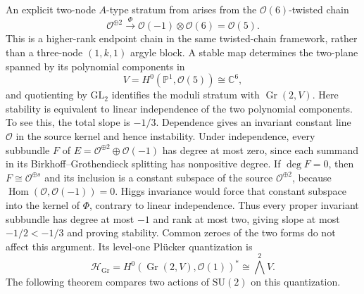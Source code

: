 \documentclass[11pt]{article}
\theoremstyle{definition}
\theoremstyle{remark}
\newcommand{\C}{\mathbb C}
\newcommand{\Pp}{\mathbb P}
\newcommand{\cH}{\mathcal H}
\newcommand{\cO}{\mathcal O}
\newcommand{\Hom}{\operatorname{Hom}}
\newcommand{\Gr}{\operatorname{Gr}}
\begin{document}
An explicit two-node $A$-type stratum from \cite[arXiv version, Section~5]{RayanSundboArgyle2018} arises from the $\cO(6)$-twisted chain
\begin{equation}\label{eq:Gr26-quiver}
 \cO^{\oplus2}
 \xrightarrow{\ \Phi\ }
 \cO(-1)\otimes\cO(6)=\cO(5).
\end{equation}
This is a higher-rank endpoint chain in the same twisted-chain framework, rather than a three-node $(1,k,1)$ argyle block.  A stable map determines the two-plane spanned by its polynomial components in
\[
 V=H^0(\Pp^1,\cO(5))\cong\C^6,
\]
and quotienting by $\mathrm{GL}_2$ identifies the moduli stratum with $\Gr(2,V)$.  Here stability is equivalent to linear independence of the two polynomial components.  To see this, the total slope is $-1/3$.  Dependence gives an invariant constant line $\cO$ in the source kernel and hence instability.  Under independence, every subbundle $F$ of $E=\cO^{\oplus2}\oplus\cO(-1)$ has degree at most zero, since each summand in its Birkhoff--Grothendieck splitting has nonpositive degree.  If $\deg F=0$, then $F\cong\cO^{\oplus s}$ and its inclusion is a constant subspace of the source $\cO^{\oplus2}$, because $\Hom(\cO,\cO(-1))=0$.  Higgs invariance would force that constant subspace into the kernel of $\Phi$, contrary to linear independence.  Thus every proper invariant subbundle has degree at most $-1$ and rank at most two, giving slope at most $-1/2<-1/3$ and proving stability.  Common zeroes of the two forms do not affect this argument.  Its level-one Pl\"ucker quantization is
\begin{equation}\label{eq:Gr26-quantization}
 \cH_{\Gr}=H^0(\Gr(2,V),\cO(1))^*
 \cong\bigwedge^2V.
\end{equation}
The following theorem compares two actions of $\mathrm{SU}(2)$ on this quantization.
\end{document}
